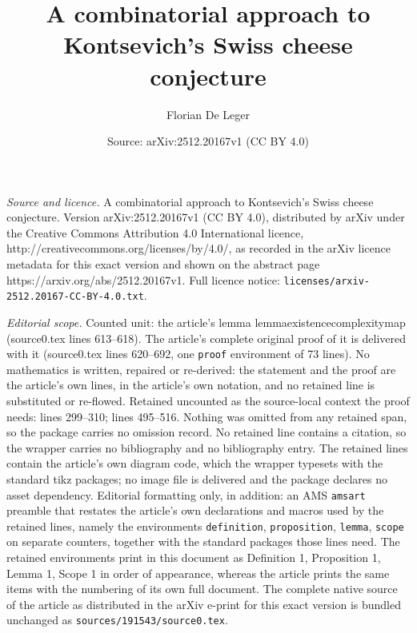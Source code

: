 \documentclass[10pt,a4paper]{amsart}
\title{A combinatorial approach to Kontsevich's Swiss cheese conjecture}
\author{Florian De Leger}
\date{Source: arXiv:2512.20167v1 (CC BY 4.0)}
\begin{document}
\maketitle

\noindent\emph{Source and licence.} A combinatorial approach to Kontsevich's Swiss cheese conjecture. Version arXiv:2512.20167v1 (CC BY 4.0), distributed by arXiv under the Creative Commons Attribution 4.0 International licence, http://creativecommons.org/licenses/by/4.0/, as recorded in the arXiv licence metadata for this exact version and shown on the abstract page https://arxiv.org/abs/2512.20167v1. Full licence notice: \texttt{licenses/arxiv-2512.20167-CC-BY-4.0.txt}.\par\smallskip

\noindent\textit{Editorial scope.} Counted unit: the article's lemma lemmaexistencecomplexitymap (source0.tex lines 613--618). The article's complete original proof of it is delivered with it (source0.tex lines 620--692, one \texttt{proof} environment of 73 lines). No mathematics is written, repaired or re-derived: the statement and the proof are the article's own lines, in the article's own notation, and no retained line is substituted or re-flowed.  Retained uncounted as the source-local context the proof needs: lines 299--310; lines 495--516.  Nothing was omitted from any retained span, so the package carries no omission record.  No retained line contains a citation, so the wrapper carries no bibliography and no bibliography entry.  The retained lines contain the article's own diagram code, which the wrapper typesets with the standard tikz packages; no image file is delivered and the package declares no asset dependency.  Editorial formatting only, in addition: an AMS \texttt{amsart} preamble that restates the article's own declarations and macros used by the retained lines, namely the environments \texttt{definition}, \texttt{proposition}, \texttt{lemma}, \texttt{scope} on separate counters, together with the standard packages those lines need.  The retained environments print in this document as Definition 1, Proposition 1, Lemma 1, Scope 1 in order of appearance, whereas the article prints the same items with the numbering of its own full document.  The complete native source of the article as distributed in the arXiv e-print for this exact version is bundled unchanged as \texttt{sources/191543/source0.tex}.
\end{document}
